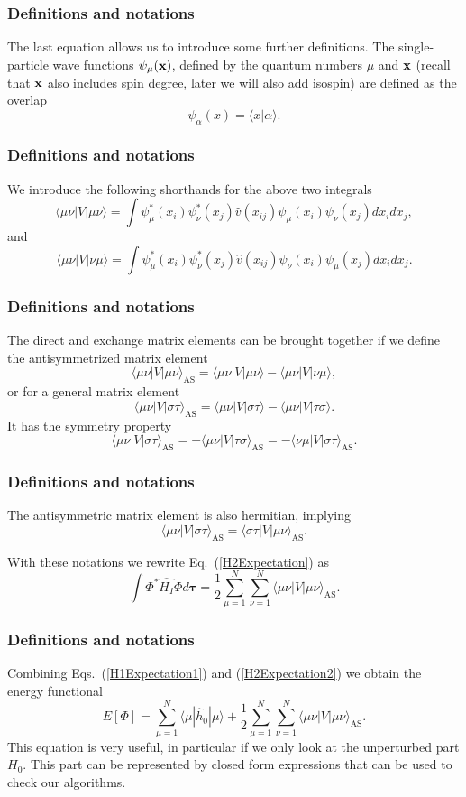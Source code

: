 \frame
{
  \frametitle{Definitions and notations}
\begin{small}
{\scriptsize
The last equation allows us to  introduce some further definitions.  
The single-particle wave functions $\psi_{\mu}({\bf x})$, defined by the quantum numbers $\mu$ and ${\bf x}$
(recall that ${\bf x}$ also includes spin degree, later we will also add isospin)   are defined as the overlap 
\[
   \psi_{\alpha}(x)  = \langle x | \alpha \rangle .
\]

}
\end{small}
}
\frame
{
  \frametitle{Definitions and notations}
\begin{small}
{\scriptsize
We introduce the following shorthands for the above two integrals
\[
\langle \mu\nu|V|\mu\nu\rangle =  \int \psi_{\mu}^*(x_i)\psi_{\nu}^*(x_j)\hat{v}(x_{ij})\psi_{\mu}(x_i)\psi_{\nu}(x_j)
    dx_idx_j,
\]
and 
\[
\langle \mu\nu|V|\nu\mu\rangle = \int \psi_{\mu}^*(x_i)\psi_{\nu}^*(x_j)
  \hat{v}(x_{ij})\psi_{\nu}(x_i)\psi_{\mu}(x_j)
  dx_idx_j.  
\]
}
\end{small}
}
\frame
{
  \frametitle{Definitions and notations}
\begin{small}
{\scriptsize
The direct and exchange matrix elements can be  brought together if we define the antisymmetrized matrix element
\[
\langle \mu\nu|V|\mu\nu\rangle_{\mathrm{AS}}= \langle \mu\nu|V|\mu\nu\rangle-\langle \mu\nu|V|\nu\mu\rangle,
\]
or for a general matrix element  
\[
\langle \mu\nu|V|\sigma\tau\rangle_{\mathrm{AS}}= \langle \mu\nu|V|\sigma\tau\rangle-\langle \mu\nu|V|\tau\sigma\rangle.
\]
It has the symmetry property
\[
\langle \mu\nu|V|\sigma\tau\rangle_{\mathrm{AS}}= -\langle \mu\nu|V|\tau\sigma\rangle_{\mathrm{AS}}=-\langle \nu\mu|V|\sigma\tau\rangle_{\mathrm{AS}}.
\]
}
\end{small}
}
\frame
{
  \frametitle{Definitions and notations}
\begin{small}
{\scriptsize
The antisymmetric matrix element is also hermitian, implying 
\[
\langle \mu\nu|V|\sigma\tau\rangle_{\mathrm{AS}}= \langle \sigma\tau|V|\mu\nu\rangle_{\mathrm{AS}}.
\]

With these notations we rewrite Eq.~(\ref{H2Expectation}) as 
\begin{equation}
  \int \Phi^*\hat{H_I}\Phi d\mathbf{\tau} 
  = \frac{1}{2}\sum_{\mu=1}^N\sum_{\nu=1}^N \langle \mu\nu|V|\mu\nu\rangle_{\mathrm{AS}}.
\label{H2Expectation2}
\end{equation}

}
\end{small}
}
\frame
{
  \frametitle{Definitions and notations}
\begin{small}
{\scriptsize
Combining Eqs.~(\ref{H1Expectation1}) and
(\ref{H2Expectation2}) we obtain the energy functional 
\begin{equation}
  E[\Phi] 
  = \sum_{\mu=1}^N \langle \mu | \hat{h}_0 | \mu \rangle +
  \frac{1}{2}\sum_{{\mu}=1}^N\sum_{{\nu}=1}^N \langle \mu\nu|V|\mu\nu\rangle_{\mathrm{AS}}.
\label{FunctionalEPhi}
\end{equation}
This equation is very useful, in particular if we only look at the unperturbed part $H_0$. This part can be represented by closed form expressions that can be used to check our algorithms.
}
\end{small}
}
